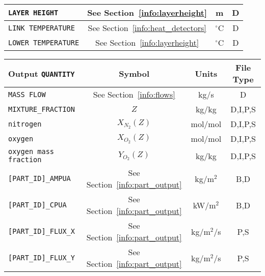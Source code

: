 \documentclass[11pt]{book}
\newcommand{\ct}{\tt\small}
\begin{document}
\begin{table}[h!]
\begin{center}
\begin{tabular}{|l|c|c|c|}
{\ct LAYER HEIGHT}                              & See Section~\ref{info:layerheight}            & m              & D            \\ \hline
{\ct LINK TEMPERATURE}                          & See Section~\ref{info:heat_detectors}         & $^\circ$C      & D            \\ \hline
{\ct LOWER TEMPERATURE}                         & See Section~\ref{info:layerheight}            & $^\circ$C      & D            \\ \hline
\end{tabular}
\end{center}
\end{table}

\begin{table}[h!]
\begin{center}
\begin{tabular}{|l|c|c|c|}
\hline
Output {\ct QUANTITY}                           & Symbol                                        & Units          & File Type    \\ \hline \hline
{\ct MASS FLOW}                                 & See Section~\ref{info:flows}                  & kg/s           & D            \\ \hline
{\ct MIXTURE\_FRACTION}                         & $Z$                                           & kg/kg          & D,I,P,S      \\ \hline
{\ct nitrogen}                                  & $X_{N_2}(Z)$                                  & mol/mol        & D,I,P,S      \\ \hline
{\ct oxygen}                                    & $X_{O_2}(Z)$                                  & mol/mol        & D,I,P,S      \\ \hline
{\ct oxygen mass fraction}                      & $Y_{O_2}(Z)$                                  & kg/kg          & D,I,P,S      \\ \hline
{\ct [PART\_ID]\_AMPUA}                         & See Section~\ref{info:part_output}            & kg/m$^2$       & B,D          \\ \hline
{\ct [PART\_ID]\_CPUA}                          & See Section~\ref{info:part_output}            & kW/m$^2$       & B,D          \\ \hline
{\ct [PART\_ID]\_FLUX\_X}                       & See Section~\ref{info:part_output}            & kg/m$^2$/s     & P,S          \\ \hline
{\ct [PART\_ID]\_FLUX\_Y}                       & See Section~\ref{info:part_output}            & kg/m$^2$/s     & P,S          \\ \hline

\end{tabular}
\end{center}
\end{table}
\end{document}
